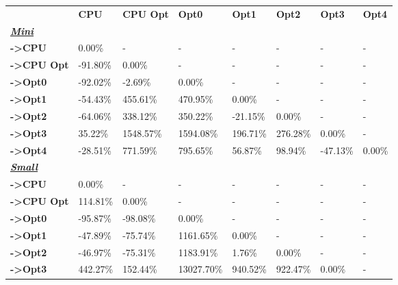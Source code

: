 \begin{table}[H]
    \centering
    \begin{tabular}{llllllll}
    \rowcolor[HTML]{DAE8FC} \ &  \textbf{CPU} &  \textbf{CPU Opt} &  \textbf{Opt0} &  \textbf{Opt1} &  \textbf{Opt2} &  \textbf{Opt3} &  \textbf{Opt4} \\
    \cellcolor[HTML]{DAE8FC} \textbf{\textbf{{\emph{{\underline{{Mini}}}}}}} &  &  &  &  &  &  &  \\
    \rowcolor[HTML]{EFEFEF} \cellcolor[HTML]{DAE8FC} \textbf{->CPU} & 0.00\% & - & - & - & - & - & - \\
    \cellcolor[HTML]{DAE8FC} \textbf{->CPU Opt} & -91.80\% & 0.00\% & - & - & - & - & - \\
    \rowcolor[HTML]{EFEFEF} \cellcolor[HTML]{DAE8FC} \textbf{->Opt0} & -92.02\% & -2.69\% & 0.00\% & - & - & - & - \\
    \cellcolor[HTML]{DAE8FC} \textbf{->Opt1} & -54.43\% & 455.61\% & 470.95\% & 0.00\% & - & - & - \\
    \rowcolor[HTML]{EFEFEF} \cellcolor[HTML]{DAE8FC} \textbf{->Opt2} & -64.06\% & 338.12\% & 350.22\% & -21.15\% & 0.00\% & - & - \\
    \cellcolor[HTML]{DAE8FC} \textbf{->Opt3} & 35.22\% & 1548.57\% & 1594.08\% & 196.71\% & 276.28\% & 	0.00\% & - \\
    \rowcolor[HTML]{EFEFEF} \cellcolor[HTML]{DAE8FC} \textbf{->Opt4} & -28.51\% & 771.59\% & 795.65\% & 56.87\% & 98.94\% & 	-47.13\% & 	0.00\% \\
    \cellcolor[HTML]{DAE8FC} \textbf{\textbf{{\emph{{\underline{{Small}}}}}}} &  &  &  &  &  &  &  \\
    \rowcolor[HTML]{EFEFEF} \cellcolor[HTML]{DAE8FC} \textbf{->CPU} & 0.00\% & - & - & - & - & - & - \\
    \cellcolor[HTML]{DAE8FC} \textbf{->CPU Opt} & 114.81\% & 0.00\% & - & - & - & - & - \\
    \rowcolor[HTML]{EFEFEF} \cellcolor[HTML]{DAE8FC} \textbf{->Opt0} & -95.87\% & -98.08\% & 0.00\% & - & - & - & - \\
    \cellcolor[HTML]{DAE8FC} \textbf{->Opt1} & -47.89\% & -75.74\% & 1161.65\% & 0.00\% & - & - & - \\
    \rowcolor[HTML]{EFEFEF} \cellcolor[HTML]{DAE8FC} \textbf{->Opt2} & -46.97\% & -75.31\% & 1183.91\% & 1.76\% & 0.00\% & - & - \\
    \cellcolor[HTML]{DAE8FC} \textbf{->Opt3} & 442.27\% & 152.44\% & 13027.70\% & 940.52\% & 922.47\% & 	0.00\% & - \\

\end{tabular}
\end{table}
